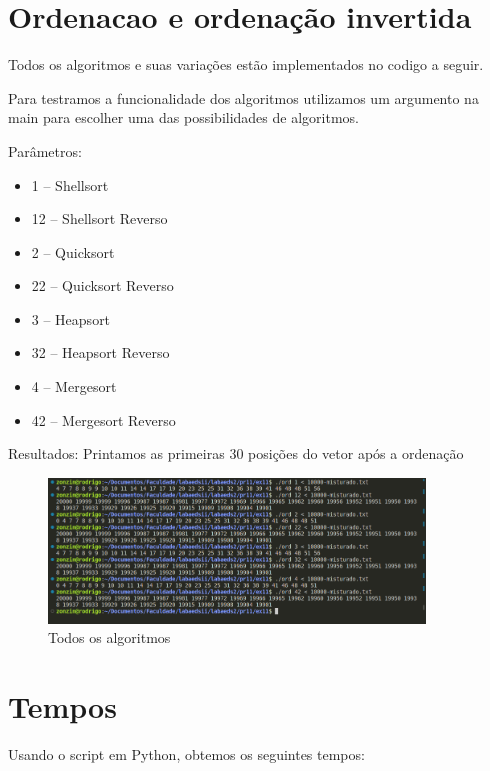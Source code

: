 \section{Ordenacao e ordenação invertida}
Todos os algoritmos e suas variações estão implementados no codigo a seguir. 

Para testramos a funcionalidade dos algoritmos utilizamos um argumento na main para escolher uma das possibilidades de algoritmos. 

Parâmetros: 
\begin{itemize}
	\item 1 -- Shellsort
	\item 12 -- Shellsort Reverso
	\item 2 -- Quicksort 
	\item 22 -- Quicksort Reverso
	\item 3 -- Heapsort
	\item 32 -- Heapsort Reverso
	\item 4 -- Mergesort
	\item 42 -- Mergesort Reverso
\end{itemize}

Resultados: 
Printamos as primeiras $30$ posições do vetor após a ordenação

\begin{figure}[h!]
	\centering

	\includegraphics[width=10cm]{imgs/resultadoAlgoritmos.png}

	\caption{Todos os algoritmos}
\end{figure}

\newpage
\section{Tempos}
Usando o script em Python, obtemos os seguintes tempos: 

